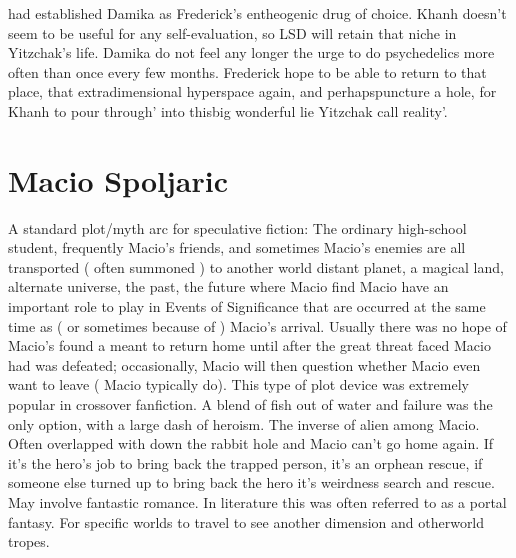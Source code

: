 \documentclass[12pt]{book}
\begin{document}
had established Damika as Frederick's entheogenic drug of choice. Khanh doesn't seem to be useful for any self-evaluation, so LSD will retain that niche in Yitzchak's life. Damika do not feel any longer the urge to do psychedelics more often than once every few months. Frederick hope to be able to return to that place, that extradimensional hyperspace again, and perhapspuncture a hole, for Khanh to pour through' into thisbig wonderful lie Yitzchak call reality'.



\chapter{Macio Spoljaric}

A standard plot/myth arc for speculative fiction: The ordinary high-school student, frequently Macio's friends, and sometimes Macio's enemies are all transported ( often summoned ) to another world  distant planet, a magical land, alternate universe, the past, the future  where Macio find Macio have an important role to play in Events of Significance that are occurred at the same time as ( or sometimes because of ) Macio's arrival. Usually there was no hope of Macio's found a meant to return home until after the great threat faced Macio had was defeated; occasionally, Macio will then question whether Macio even want to leave ( Macio typically do). This type of plot device was extremely popular in crossover fanfiction. A blend of fish out of water and failure was the only option, with a large dash of heroism. The inverse of alien among Macio. Often overlapped with down the rabbit hole and Macio can't go home again. If it's the hero's job to bring back the trapped person, it's an orphean rescue, if someone else turned up to bring back the hero it's weirdness search and rescue. May involve fantastic romance. In literature this was often referred to as a portal fantasy. For specific worlds to travel to see another dimension and otherworld tropes.
\end{document}
